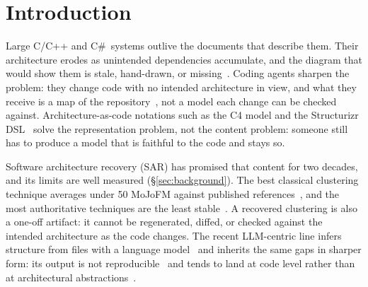 \section{Introduction}
\label{sec:intro}


Large C/C++ and C\#\ systems outlive the documents that describe them. Their architecture erodes
as unintended dependencies accumulate, and the diagram that would show them is stale, hand-drawn,
or missing~\cite{perry1992foundations,anthony2024drift}. Coding agents sharpen the problem: they
change code with no intended architecture in view, and what they receive is a map of the
repository~\cite{chernyshahar2026rig}, not a model each change can be checked against.
Architecture-as-code notations such as the C4 model and the Structurizr
DSL~\cite{brown2026c4,structurizrdsl} solve the representation problem, not the content problem:
someone still has to produce a model that is faithful to the code and stays so.

Software architecture recovery (SAR) has promised that content for two decades, and its limits are
well measured (\S\ref{sec:background}). The best classical clustering technique averages under 50
MoJoFM against published references~\cite{lutellier-deps,zhang2023sarif}, and the most
authoritative techniques are the least stable~\cite{wu2005comparison,link2019value}. A recovered
clustering is also a one-off artifact: it cannot be regenerated, diffed, or checked against the
intended architecture as the code changes. The recent LLM-centric line infers structure from files
with a language model~\cite{archagent,deluca2026ciao} and inherits the same gaps in sharper form:
its output is not reproducible~\cite{angermeir2026reproducibility} and tends to land at code level
rather than at architectural abstractions~\cite{sathvika2026views}.

